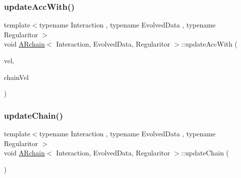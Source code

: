 \mbox{\label{class_a_rchain_a92865bff07dc16e3065a8f695120a5f5}} 
\subsubsection{\texorpdfstring{update\+Acc\+With()}{updateAccWith()}}
{\footnotesize\ttfamily template$<$typename Interaction , typename Evolved\+Data , typename Regularitor $>$ \\
void \mbox{\hyperlink{class_a_rchain}{A\+Rchain}}$<$ Interaction, Evolved\+Data, Regularitor $>$\+::update\+Acc\+With (\begin{DoxyParamCaption}\item[{\mbox{\hyperlink{class_a_rchain_a019fbadb9f4e5892736d9127537338bb}{Vector\+Array}} \&}]{vel,  }\item[{\mbox{\hyperlink{class_a_rchain_a019fbadb9f4e5892736d9127537338bb}{Vector\+Array}} \&}]{chain\+Vel }\end{DoxyParamCaption})\hspace{0.3cm}{\ttfamily [private]}}

\mbox{\label{class_a_rchain_ad576df000b6d9f3948eae2793c6b3c54}} 
\subsubsection{\texorpdfstring{update\+Chain()}{updateChain()}}
{\footnotesize\ttfamily template$<$typename Interaction , typename Evolved\+Data , typename Regularitor $>$ \\
void \mbox{\hyperlink{class_a_rchain}{A\+Rchain}}$<$ Interaction, Evolved\+Data, Regularitor $>$\+::update\+Chain (\begin{DoxyParamCaption}{ }\end{DoxyParamCaption})\hspace{0.3cm}{\ttfamily [private]}}

